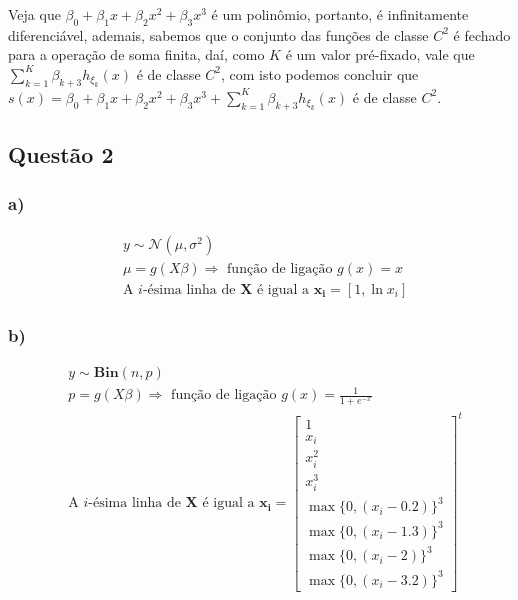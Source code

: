 \documentclass[
]{article}
\begin{document}
Veja que \(\beta_0+\beta_1x+\beta_2x^2+\beta_3x^3\) é um polinômio,
portanto, é infinitamente diferenciável, ademais, sabemos que o conjunto
das funções de classe \(C^2\) é fechado para a operação de soma finita,
daí, como \(K\) é um valor pré-fixado, vale que
\(\sum_{k=1}^K\beta_{k+3}h_{\xi_k}(x)\) é de classe \(C^2\), com isto
podemos concluir que
\(s(x)=\beta_0+\beta_1x+\beta_2x^2+\beta_3x^3+\sum_{k=1}^K\beta_{k+3}h_{\xi_k}(x)\)
é de classe \(C^2\).

\hypertarget{questuxe3o-2}{%
\subsection{Questão 2}\label{questuxe3o-2}}

\hypertarget{a-1}{%
\subsubsection{a)}\label{a-1}}

\[
\begin{aligned}
&y \sim \mathcal{N}(\mu,\sigma^2)\\
&\mu = g(X\beta)\Rightarrow \text{ função de ligação }  g(x)=x\\
&\text{A }i\text{-ésima linha de }\boldsymbol{X}\text{ é igual a }\boldsymbol{x_i}=\left[1,\ln x_i\right]
\end{aligned}
\]

\hypertarget{b-1}{%
\subsubsection{b)}\label{b-1}}

\[
\begin{aligned}
&y \sim \textbf{Bin}(n,p)\\
&p = g(X\beta)\Rightarrow \text{ função de ligação }  g(x)=\frac{1}{1+e^{-x}}\\
&\text{A }i\text{-ésima linha de }\boldsymbol{X}\text{ é igual a }\boldsymbol{x_i}=
\begin{bmatrix}
1\\
x_i\\
x_i^2\\
x_i^3\\
\max\{0,(x_i-0.2)\}^3\\
\max\{0,(x_i-1.3)\}^3\\
\max\{0,(x_i-2)\}^3\\
\max\{0,(x_i-3.2)\}^3
\end{bmatrix}^t
\end{aligned}
\]
\end{document}
